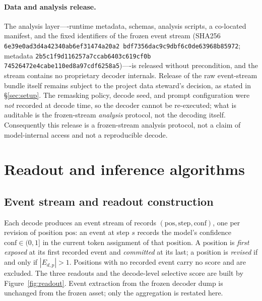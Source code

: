 \documentclass{article}
\begin{document}
\paragraph{Data and analysis release.}
The analysis layer----runtime metadata, schemas, analysis scripts, a co-located manifest, and
the fixed identifiers of the frozen event stream (SHA256
\texttt{6e39e0ad3d4a4234\allowbreak 0ab6ef31474a20a2\allowbreak
bdf7356dac9c9dbf\allowbreak 6c0de63968b85972}; metadata
\texttt{2b5c1f9d116257a7\allowbreak ccab6403c619cf0b\allowbreak
74526472e4cabe11\allowbreak 0ed8a97cdf6258a5})----is released without precondition, and the
stream contains no proprietary decoder internals.  Release of the raw event-stream bundle
itself remains subject to the project data steward's decision, as stated in
\S\ref{sec:setup}.  The remasking policy, decode seed, and prompt configuration were
\emph{not} recorded at decode time, so the decoder cannot be re-executed; what is auditable is
the frozen-stream \emph{analysis} protocol, not the decoding itself.  Consequently this
release is a frozen-stream analysis protocol, not a claim of model-internal access and not a
reproducible decode.

\label{p5:main-text-end}




\appendix

\section{Readout and inference algorithms}
\label{app:readouts}

\subsection{Event stream and readout construction}
\label{app:readouts:algo}

Each decode produces an event stream of records $(\mathrm{pos},\mathrm{step},\mathrm{conf})$,
one per revision of position $\mathrm{pos}$: an event at step $s$ records the model's confidence
$\mathrm{conf}\in(0,1]$ in the current token assignment of that position.  A position is
\emph{first exposed} at its first recorded event and \emph{committed} at its last; a position is
\emph{revised} if and only if $|E_{d,p}|>1$.  Positions with no recorded event carry no score
and are excluded.  The three readouts and the decode-level selective score are built by
Figure~\ref{fig:readout}.  Event extraction from the frozen decoder dump is unchanged from
the frozen asset; only the aggregation is restated here.
\end{document}

